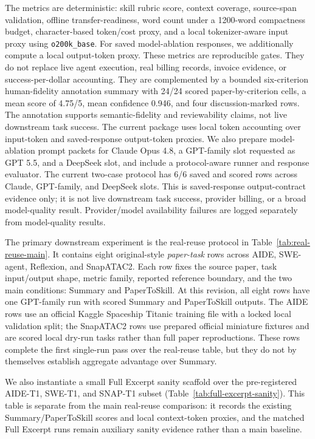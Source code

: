 \documentclass[letterpaper]{article}
\begin{document}
The metrics are deterministic: skill rubric score, context coverage,
source-span validation, offline transfer-readiness, word count under a
1200-word compactness budget, character-based token/cost proxy, and a local
tokenizer-aware input proxy using \texttt{o200k\_base}. For saved
model-ablation responses, we additionally compute a local output-token proxy.
These metrics are reproducible gates. They do not replace live agent execution,
real billing records, invoice evidence, or success-per-dollar accounting. They
are complemented by a bounded six-criterion human-fidelity annotation summary
with 24/24 scored paper-by-criterion cells, a mean score of 4.75/5, mean
confidence 0.946, and four discussion-marked rows. The annotation supports
semantic-fidelity and reviewability claims, not live downstream task success.
The current package uses local token accounting over input-token and
saved-response output-token proxies. We also
prepare model-ablation prompt packets for Claude Opus 4.8, a GPT-family slot
requested as GPT 5.5, and a DeepSeek slot, and include a protocol-aware runner
and response evaluator. The current two-case protocol has 6/6 saved and scored
rows across Claude, GPT-family, and DeepSeek slots. This is saved-response
output-contract evidence only; it is not live downstream task success,
provider billing, or a broad model-quality result. Provider/model availability
failures are logged separately from model-quality results.

The primary downstream experiment is the real-reuse protocol in
Table~\ref{tab:real-reuse-main}. It contains eight original-style
\emph{paper-task} rows across AIDE, SWE-agent, Reflexion, and SnapATAC2. Each
row fixes the source paper, task input/output shape, metric family, reported
reference boundary, and the two main conditions: Summary and PaperToSkill. At
this revision, all eight rows have one GPT-family run with scored Summary and
PaperToSkill outputs. The AIDE rows use an official Kaggle Spaceship Titanic
training file with a locked local validation split; the SnapATAC2 rows use
prepared official miniature fixtures and are scored local dry-run tasks rather
than full paper reproductions. These rows complete the first single-run pass
over the real-reuse table, but they do not by themselves establish aggregate
advantage over Summary.

We also instantiate a small Full Excerpt sanity scaffold over the
pre-registered AIDE-T1, SWE-T1, and SNAP-T1 subset
(Table~\ref{tab:full-excerpt-sanity}). This table is separate from the main
real-reuse comparison: it records the existing Summary/PaperToSkill scores and
local context-token proxies, and the matched Full Excerpt runs remain
auxiliary sanity evidence rather than a main baseline.
\end{document}

